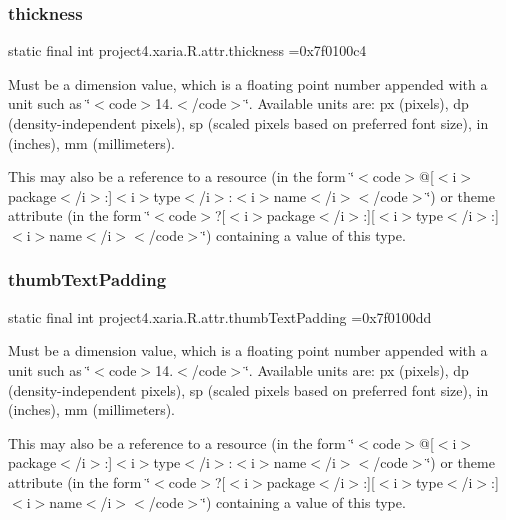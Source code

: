 \subsubsection{\texorpdfstring{thickness}{thickness}}
{\footnotesize\ttfamily static final int project4.\+xaria.\+R.\+attr.\+thickness =0x7f0100c4\hspace{0.3cm}{\ttfamily [static]}}

Must be a dimension value, which is a floating point number appended with a unit such as \char`\"{}$<$code$>$14.\+5sp$<$/code$>$\char`\"{}. Available units are\+: px (pixels), dp (density-\/independent pixels), sp (scaled pixels based on preferred font size), in (inches), mm (millimeters). 

This may also be a reference to a resource (in the form \char`\"{}$<$code$>$@\mbox{[}$<$i$>$package$<$/i$>$\+:\mbox{]}$<$i$>$type$<$/i$>$\+:$<$i$>$name$<$/i$>$$<$/code$>$\char`\"{}) or theme attribute (in the form \char`\"{}$<$code$>$?\mbox{[}$<$i$>$package$<$/i$>$\+:\mbox{]}\mbox{[}$<$i$>$type$<$/i$>$\+:\mbox{]}$<$i$>$name$<$/i$>$$<$/code$>$\char`\"{}) containing a value of this type. \mbox{\label{classproject4_1_1xaria_1_1R_1_1attr_ad480b6c72ae6418dbe211ccf324e6db9}} 
\subsubsection{\texorpdfstring{thumb\+Text\+Padding}{thumbTextPadding}}
{\footnotesize\ttfamily static final int project4.\+xaria.\+R.\+attr.\+thumb\+Text\+Padding =0x7f0100dd\hspace{0.3cm}{\ttfamily [static]}}

Must be a dimension value, which is a floating point number appended with a unit such as \char`\"{}$<$code$>$14.\+5sp$<$/code$>$\char`\"{}. Available units are\+: px (pixels), dp (density-\/independent pixels), sp (scaled pixels based on preferred font size), in (inches), mm (millimeters). 

This may also be a reference to a resource (in the form \char`\"{}$<$code$>$@\mbox{[}$<$i$>$package$<$/i$>$\+:\mbox{]}$<$i$>$type$<$/i$>$\+:$<$i$>$name$<$/i$>$$<$/code$>$\char`\"{}) or theme attribute (in the form \char`\"{}$<$code$>$?\mbox{[}$<$i$>$package$<$/i$>$\+:\mbox{]}\mbox{[}$<$i$>$type$<$/i$>$\+:\mbox{]}$<$i$>$name$<$/i$>$$<$/code$>$\char`\"{}) containing a value of this type. \mbox{\label{classproject4_1_1xaria_1_1R_1_1attr_ae417c426a307613087f798ef5151d656}} 
